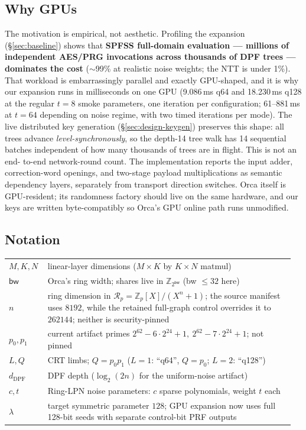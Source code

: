 \documentclass[11pt]{article}
\newcommand{\Z}{\mathbb{Z}}
\newcommand{\Ring}{\mathcal{R}}
\newcommand{\bw}{\mathsf{bw}}
\newcommand{\modtwo}{\Z_{2^{\bw}}}
\newcommand{\Q}{Q}   %
\newcommand{\dpfd}{d_{\mathrm{DPF}}} %
\begin{document}
\subsection{Why GPUs}
\label{sec:motivation-gpu}

The motivation is empirical, not aesthetic. Profiling the expansion
(\S\ref{sec:baseline}) shows that \textbf{SPFSS full-domain evaluation ---
millions of independent AES/PRG invocations across thousands of DPF trees ---
dominates the cost} ($\sim$99\% at realistic noise weights; the NTT is under
1\%). That workload is embarrassingly parallel and exactly GPU-shaped, and it
is why our expansion runs in milliseconds on one GPU
(9.086\,ms q64 and 18.230\,ms q128 at the regular $t{=}8$ smoke parameters,
one iteration per configuration; 61--881\,ms at $t{=}64$ depending on noise
regime, with two timed iterations per mode). The live distributed key generation
(\S\ref{sec:design-keygen}) preserves this shape: all trees advance
\emph{level-synchronously}, so the depth-14 tree walk has 14 sequential batches
independent of how many thousands of trees are in flight. This is not an end-
to-end network-round count. The implementation reports the input adder,
correction-word openings, and two-stage payload multiplications as semantic
dependency layers, separately from transport direction switches.
Orca itself is GPU-resident; its randomness factory should live on the same
hardware, and our keys are written
byte-compatibly so Orca's GPU online path runs unmodified.

\subsection{Notation}
\label{sec:notation}

\begin{table}[ht]
\centering
\small
\begin{tabular}{@{}p{0.13\linewidth}p{0.83\linewidth}@{}}
\toprule
$M,K,N$ & linear-layer dimensions ($M{\times}K$ by $K{\times}N$ matmul)\\
$\bw$ & Orca's ring width; shares live in $\modtwo$ (bw $\le 32$ here)\\
$n$ & ring dimension in $\Ring_p=\Z_p[X]/(X^n+1)$; the source manifest uses
$8192$, while the retained full-graph control overrides it to $262144$;
neither is security-pinned\\
$p_0,p_1$ & current artifact primes
$2^{62}-6\cdot2^{24}+1,\ 2^{62}-7\cdot2^{24}+1$; not pinned\\
$L,\Q$ & CRT limbs; $\Q=p_0p_1$ ($L{=}1$: ``q64'', $\Q=p_0$;
$L{=}2$: ``q128'')\\
$\dpfd$ & DPF depth ($\log_2(2n)$ for the uniform-noise artifact)\\
$c,t$ & Ring-LPN noise parameters: $c$ sparse polynomials, weight $t$ each\\
$\lambda$ & target symmetric parameter $128$; GPU expansion now uses full
128-bit seeds with separate control-bit PRF outputs\\
\bottomrule
\end{tabular}
\end{table}
\end{document}
